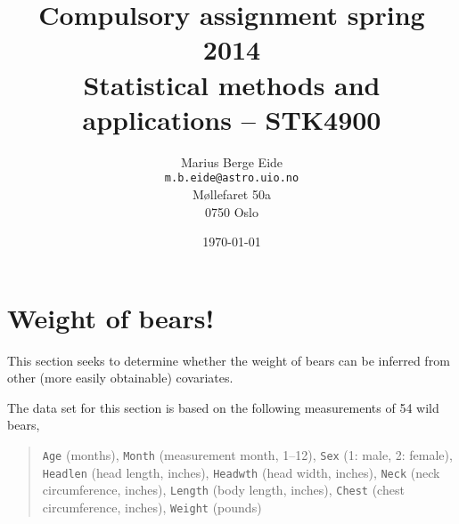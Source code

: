 \documentclass[a4paper,11pt]{article}
\date{\today}
\title{Compulsory assignment spring 2014\\ \small{Statistical methods and applications -- STK4900}}
\author{Marius Berge Eide \\ \texttt{m.b.eide@astro.uio.no} \\
M{\o}llefaret 50a \\ 0750 Oslo}
\begin{document}
\onecolumn
\maketitle{}


\section{Weight of bears!}
This section seeks to determine whether the weight of bears can be inferred from other (more easily obtainable) covariates.

The data set for this section is based on the following measurements of 54 wild bears,
\begin{quote}
    \texttt{Age} (months), \texttt{Month} (measurement month, 1--12), \texttt{Sex} (1: male, 2: female), \texttt{Headlen} (head length, inches), \texttt{Headwth} (head width, inches), \texttt{Neck} (neck circumference, inches), \texttt{Length} (body length, inches), \texttt{Chest} (chest circumference, inches), \texttt{Weight} (pounds)
\end{quote}
\end{document}
